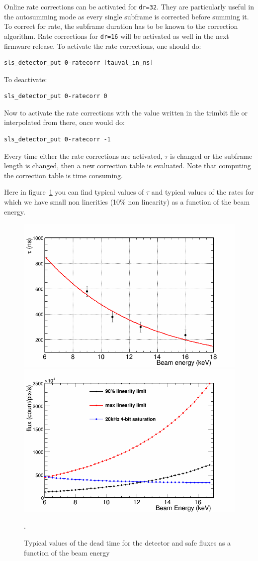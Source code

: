 \documentclass{article}
\begin{document}
{{{Online rate corrections can be activated for {\tt{dr=32}}. They are particularly useful in the autosumming mode as  every single subframe is corrected before summing it. To correct for rate, the subframe duration has to be known to the correction algorithm. Rate corrections for {\tt{dr=16}} will be activated as well in the next firmware release.     
To activate the rate corrections, one should do:\\
\begin{verbatim}
sls_detector_put 0-ratecorr [tauval_in_ns]
\end{verbatim}
To deactivate:
\begin{verbatim}
sls_detector_put 0-ratecorr 0
\end{verbatim}

 Now to activate the rate corrections with the value written in the trimbit file or interpolated from there, once would do: 
\begin{verbatim}
sls_detector_put 0-ratecorr -1
\end{verbatim}

Every time either the rate corrections are activated, $\tau$ is changed or the subframe length is changed, then a new correction table is evaluated. Note that computing the correction table is time consuming. 

Here in figure~\ref{rateplots} you can find typical values of $\tau$  and typical values of the rates for which we have small non linerities (10\% non linearity) as a function of the beam energy.
\begin{figure}[t]
\begin{center}
\includegraphics[width=.7\textwidth]{tauvsE}
\includegraphics[width=.7\textwidth]{Ratecapabilityflux}
\end{center}
\caption{Typical values of the dead time for the detector and safe fluxes as a function of the beam energy}.
\label{rateplots}
\end{figure}




}}}
\end{document}
